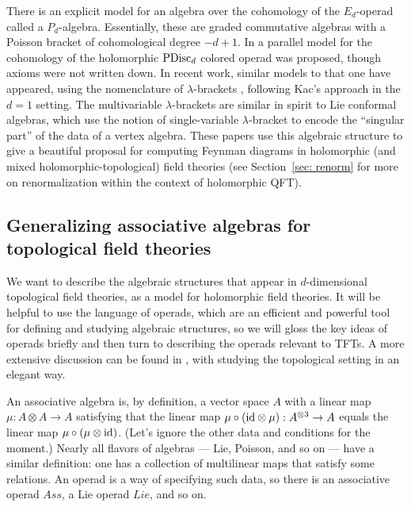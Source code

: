 \documentclass[11pt]{amsart}
\begin{document}
There is an explicit model for an algebra over the cohomology of the $E_d$-operad called a $P_d$-algebra.
Essentially, these are graded commutative algebras with a Poisson bracket of cohomological degree $-d+1$.
In \cite{CosScheim} a parallel model for the cohomology of the holomorphic ${\rm PDisc}_d$ colored operad was proposed, 
though axioms were not written down.
In recent work, similar models to that one have appeared,
using the nomenclature of $\lambda$-brackets \cite{BGKWY,GKW},
following Kac's approach in the $d=1$ setting. 
The multivariable $\lambda$-brackets are similar in spirit to Lie conformal algebras,
which use the notion of single-variable $\lambda$-bracket to encode the ``singular part'' of the data of a vertex algebra.
These papers use this algebraic structure to give a beautiful proposal for computing Feynman diagrams in holomorphic (and mixed holomorphic-topological) field theories (see Section~\ref{sec: renorm} for more on renormalization within the context of holomorphic QFT).


\subsection{Generalizing associative algebras for topological field theories}

We want to describe the algebraic structures that appear in $d$-dimensional topological field theories,
as a model for holomorphic field theories.
It will be helpful to use the language of operads, which are an efficient and powerful tool for defining and studying algebraic structures,
so we will gloss the key ideas of operads briefly and then turn to describing the operads relevant to TFTs.
A more extensive discussion can be found in \cite{CG1}, with \cite{EllSaf} studying the topological setting in an elegant way.

An associative algebra is, by definition, a vector space $A$ with a linear map $\mu: A\otimes A \to A$ satisfying that the linear map $\mu \circ ({\rm id} \otimes \mu): A^{\otimes 3} \to A$ equals the linear map $\mu \circ (\mu \otimes {\rm id})$.
(Let's ignore the other data and conditions for the moment.)
Nearly all flavors of algebras --- Lie, Poisson, and so on --- have a similar definition:
one has a collection of multilinear maps that satisfy some relations.
An operad is a way of specifying such data, so there is an associative operad $Ass$,
a Lie operad $Lie$, and so on.
\end{document}
